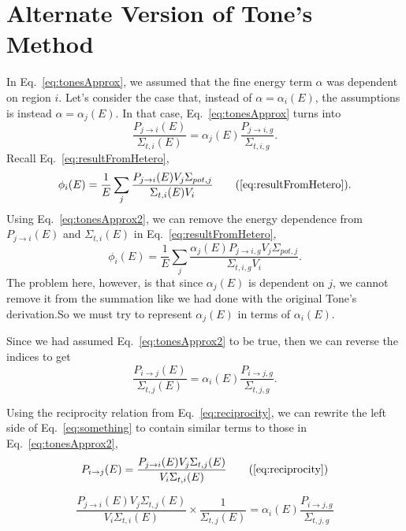 \documentclass[10pt]{article}
\begin{document}
\section{Alternate Version of Tone's Method}
In Eq.~\ref{eq:tonesApprox}, we assumed that the fine energy term $\alpha$ was dependent on region $i$. Let's consider the case that, instead of $\alpha=\alpha_i(E)$, the assumptions is instead $\alpha=\alpha_j(E)$. In that case, Eq.~\ref{eq:tonesApprox} turns into
\begin{equation}\frac{P_{j\rightarrow i}(E)}{\Sigma_{t,i}(E)}=\alpha_{j}(E)\frac{P_{j\rightarrow i,g}}{\Sigma_{t,i,g}}\label{eq:tonesApprox2}.\end{equation}
Recall Eq.~\ref{eq:resultFromHetero},
\begin{equation*}\phi_{i}(E)=\frac{1}{E}\sum\limits_j\frac{P_{j\rightarrow i}(E)V_{j}\Sigma_{pot,j}}{\Sigma_{t,i}(E)V_{i}}\tag{\ref{eq:resultFromHetero}}.\end{equation*}
  Using Eq.~\ref{eq:tonesApprox2}, we can remove the energy dependence from $P_{j\rightarrow i}(E)$ and $\Sigma_{t,i}(E)$ in Eq.~\ref{eq:resultFromHetero},
\begin{equation}\phi_{i}(E)=\frac{1}{E}\sum\limits_j\frac{\alpha_j(E)P_{j\rightarrow i,g}V_{j}\Sigma_{pot,j}}{\Sigma_{t,i,g}V_{i}}.\label{eq:phiWithalphaj}\end{equation}
The problem here, however, is that since $\alpha_j(E)$ is dependent on $j$, we cannot remove it from the summation like we had done with the original Tone's derivation.So we must try to represent $\alpha_j(E)$ in terms of $\alpha_i(E)$.

Since we had assumed Eq.~\ref{eq:tonesApprox2} to be true, then we can reverse the indices to get
\begin{equation}\frac{P_{i\rightarrow j}(E)}{\Sigma_{t,j}(E)}=\alpha_{i}(E)\frac{P_{i\rightarrow j,g}}{\Sigma_{t,j,g}}\label{eq:something}.\end{equation}

Using the reciprocity relation from Eq.~\ref{eq:reciprocity}, we can rewrite the left side of Eq.~\ref{eq:something} to contain similar terms to those in Eq.~\ref{eq:tonesApprox2},
\begin{equation}P_{i\rightarrow j}(E)=\frac{P_{j\rightarrow i}(E)V_{j}\Sigma_{t,j}(E)}{V_{i}\Sigma_{t,i}(E)}\tag{\ref{eq:reciprocity}}\end{equation}


\begin{equation}\frac{P_{j\rightarrow i}(E)V_{j}\Sigma_{t,j}(E)}{V_{i}\Sigma_{t,i}(E)}\times\frac{1}{\Sigma_{t,j}(E)}=\alpha_{i}(E)\frac{P_{i\rightarrow j,g}}{\Sigma_{t,j,g}}\end{equation}
\end{document}
